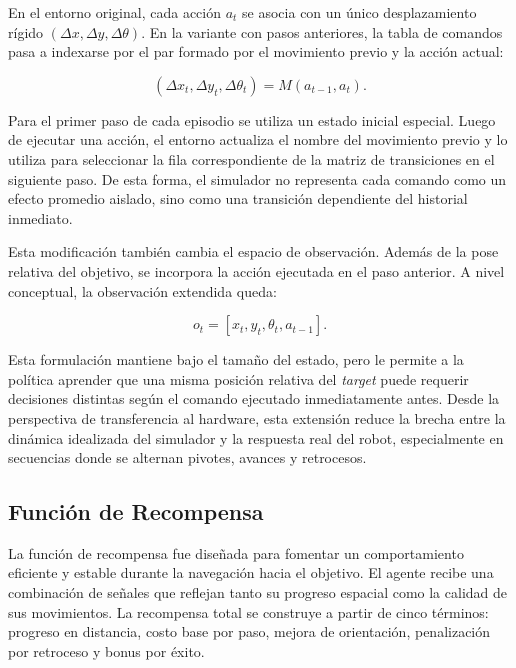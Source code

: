 \documentclass[conference]{IEEEtran}
\begin{document}
En el entorno original, cada acción $a_t$ se asocia con un único desplazamiento rígido $(\Delta x,\Delta y,\Delta\theta)$. En la variante con pasos anteriores, la tabla de comandos pasa a indexarse por el par formado por el movimiento previo y la acción actual:

\begin{equation}
    (\Delta x_t,\Delta y_t,\Delta\theta_t) =
    M(a_{t-1}, a_t).
    \label{eq:previous-motion-model}
\end{equation}

Para el primer paso de cada episodio se utiliza un estado inicial especial. Luego de ejecutar una acción, el entorno actualiza el nombre del movimiento previo y lo utiliza para seleccionar la fila correspondiente de la matriz de transiciones en el siguiente paso. De esta forma, el simulador no representa cada comando como un efecto promedio aislado, sino como una transición dependiente del historial inmediato.

Esta modificación también cambia el espacio de observación. Además de la pose relativa del objetivo, se incorpora la acción ejecutada en el paso anterior. A nivel conceptual, la observación extendida queda:

\begin{equation}
    o_t = [x_t, y_t, \theta_t, a_{t-1}].
    \label{eq:previous-action-observation}
\end{equation}

Esta formulación mantiene bajo el tamaño del estado, pero le permite a la política aprender que una misma posición relativa del \textit{target} puede requerir decisiones distintas según el comando ejecutado inmediatamente antes. Desde la perspectiva de transferencia al hardware, esta extensión reduce la brecha entre la dinámica idealizada del simulador y la respuesta real del robot, especialmente en secuencias donde se alternan pivotes, avances y retrocesos.

\subsection{Función de Recompensa}
La función de recompensa fue diseñada para fomentar un comportamiento eficiente y estable durante la navegación hacia el objetivo. El agente recibe una combinación de señales que reflejan tanto su progreso espacial como la calidad de sus movimientos. La recompensa total se construye a partir de cinco términos: progreso en distancia, costo base por paso, mejora de orientación, penalización por retroceso y bonus por éxito.
\end{document}

